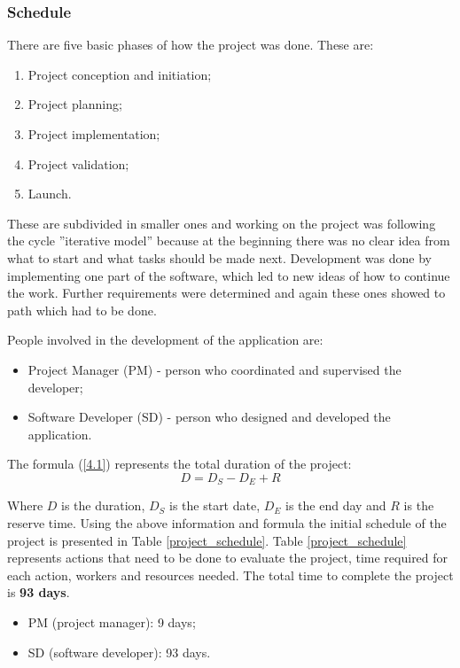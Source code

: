 \subsubsection{Schedule}
There are five basic phases of how the project was done. These are:
\vspace{-5pt}
\begin{enumerate}
  \item Project conception and initiation;
  \item Project planning;
  \item Project implementation;
  \item Project validation; 
  \item Launch. 
\end{enumerate}
These are subdivided in smaller ones and working on the project was following the cycle ”iterative model” because at the beginning there was no clear idea from what to start and what tasks should be made next. Development was done by implementing one part of the software, which led to new ideas of how to continue the work. Further requirements were determined and again these ones showed to path which had to be done. 

People involved in the development of the application are:
\vspace{-5pt}
\begin{itemize}
  \item Project Manager (PM) - person who coordinated and supervised the developer; 
  \item Software Developer (SD) - person who designed and developed the application. 
\end{itemize}
The formula (\ref{4.1}) represents the total duration of the project:
\begin{equation}
D = D_{S} - D_{E} + R  \label{4.1}
\end{equation}

Where $D$ is the duration, $D_{S}$ is the start date, $D_{E}$ is the end day and $R$ is the reserve time. Using the above information and formula the initial schedule of the project is presented in Table \ref{project_schedule}.  Table \ref{project_schedule} represents actions that need to be done to evaluate the project, time required for each action, workers and resources needed. The total time to complete the project is {\bf93 days}.

\begin{itemize}
  \item PM (project manager): 9 days;
  \item SD (software developer): 93 days.
\end{itemize}

